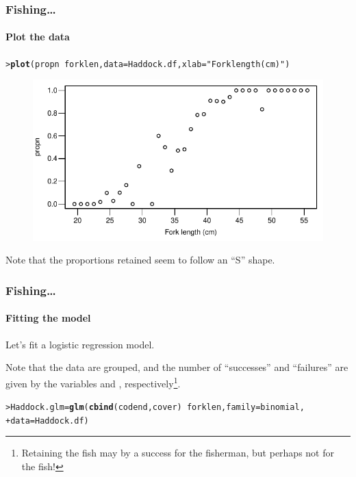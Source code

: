 \documentclass{beamer}\usepackage[]{graphicx}\usepackage[]{xcolor}
\makeatletter
\newcommand{\hlstr}[1]{\textcolor[rgb]{0.192,0.494,0.8}{#1}}%
\newcommand{\hlopt}[1]{\textcolor[rgb]{0,0,0}{#1}}%
\newcommand{\hlstd}[1]{\textcolor[rgb]{0.345,0.345,0.345}{#1}}%
\newcommand{\hlkwb}[1]{\textcolor[rgb]{0.69,0.353,0.396}{#1}}%
\newcommand{\hlkwc}[1]{\textcolor[rgb]{0.333,0.667,0.333}{#1}}%
\newcommand{\hlkwd}[1]{\textcolor[rgb]{0.737,0.353,0.396}{\textbf{#1}}}%
\newenvironment{kframe}{%
 \def\at@end@of@kframe{}%
 \ifinner\ifhmode%
  \def\at@end@of@kframe{\end{minipage}}%
  \begin{minipage}{\columnwidth}%
 \fi\fi%
 \def\FrameCommand##1{\hskip\@totalleftmargin \hskip-\fboxsep
 \colorbox{shadecolor}{##1}\hskip-\fboxsep
     \hskip-\linewidth \hskip-\@totalleftmargin \hskip\columnwidth}%
 \MakeFramed {\advance\hsize-\width
   \@totalleftmargin\z@ \linewidth\hsize
   \@setminipage}}%
 {\par\unskip\endMakeFramed%
 \at@end@of@kframe}
\newenvironment{knitrout}{}{} %
\makeatother
\begin{document}
\begin{frame}[fragile]
\frametitle{Fishing\ldots}
\framesubtitle{Plot the data}
\begin{knitrout}\scriptsize
{}\color{fgcolor}\begin{kframe}
\begin{alltt}
\hlstd{> }\hlkwd{plot}\hlstd{(propn} \hlopt{~} \hlstd{forklen,} \hlkwc{data} \hlstd{= Haddock.df,} \hlkwc{xlab} \hlstd{=} \hlstr{"Fork length (cm)"}\hlstd{)}
\end{alltt}
\end{kframe}
\end{knitrout}

\begin{figure}
  \centering
  \includegraphics{figure/RC-H15-036}
\end{figure}

Note that the proportions retained seem to follow an ``S'' shape.
\end{frame}


\begin{frame}[fragile]
\frametitle{Fishing\ldots}
\framesubtitle{Fitting the model}
Let's fit a logistic regression model. 
\bigskip

Note that the data are grouped, and the number of ``successes'' and ``failures'' are given by the variables  and , respectively\footnote{Retaining the fish may by a success for the fisherman, but perhaps not for the fish!}. 
\bigskip

\begin{knitrout}\scriptsize
{}\color{fgcolor}\begin{kframe}
\begin{alltt}
\hlstd{> }\hlstd{Haddock.glm} \hlkwb{=} \hlkwd{glm}\hlstd{(}\hlkwd{cbind}\hlstd{(codend,cover)} \hlopt{~} \hlstd{forklen,} \hlkwc{family} \hlstd{= binomial,}
\hlstd{+ }                  \hlkwc{data} \hlstd{= Haddock.df)}
\end{alltt}
\end{kframe}
\end{knitrout}

\end{frame}
\end{document}
